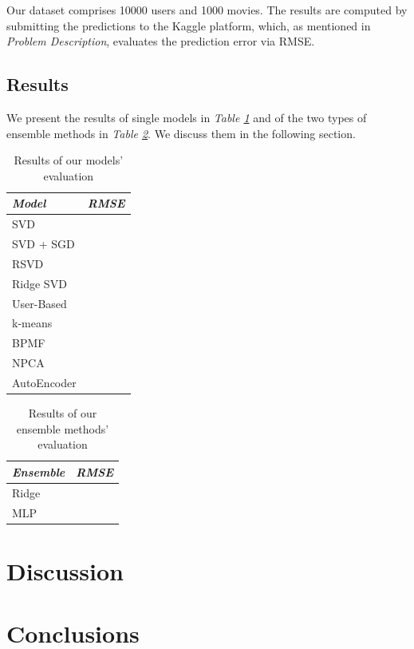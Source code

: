 \documentclass[10pt,conference,compsocconf]{IEEEtran}
\begin{document}
Our dataset comprises 10000 users and 1000 movies. The results are computed by submitting the predictions to the Kaggle platform, which, as mentioned in \emph{Problem Description}, evaluates the prediction error via RMSE.

\subsection{Results}

We present the results of single models in \emph{Table \ref{tabres}} and of the two types of ensemble methods in \emph{Table \ref{ensres}}. We discuss them in the following section.

\begin{table}[h!]
	\centering
	\begin{tabular}{l|l}
		\textit{\textbf{Model}} & \textit{\textbf{RMSE}} \\
		\hline
		SVD                     &                        \\
		SVD + SGD               &                        \\
		RSVD       	            &                        \\
		Ridge SVD               &                        \\
		User-Based              &                        \\
		k-means                 &                        \\
		BPMF                    &                        \\
		NPCA                    &                        \\
		AutoEncoder             &                       
	\end{tabular}
\caption{Results of our models' evaluation}
\label{tabres}
\end{table}

\begin{table}[h!]
	\centering
	\begin{tabular}{l|l}
		\textit{\textbf{Ensemble}} & \textit{\textbf{RMSE}} \\
		\hline
		Ridge                     &                        \\
		MLP      	            &                                            
	\end{tabular}
\caption{Results of our ensemble methods' evaluation}
\label{ensres}
\end{table}

\section{Discussion}
\label{disc}


\section{Conclusions}
\label{conc}


\end{document}

